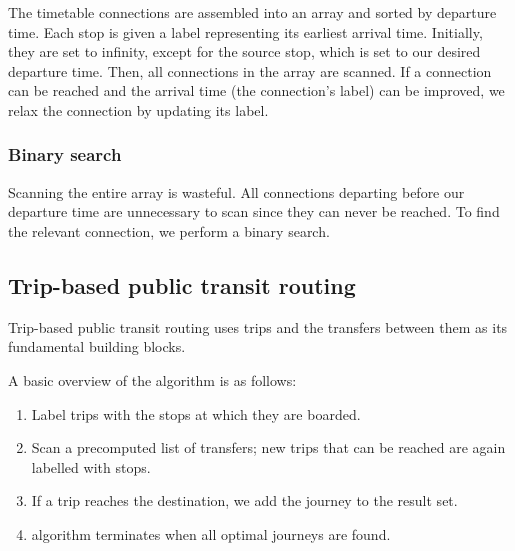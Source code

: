 The timetable connections are assembled into an array and sorted by departure time. Each stop is given a label representing its earliest arrival time. Initially, they are set to infinity, except for the source stop, which is set to our desired departure time. Then, all connections in the array are scanned. If a connection can be reached and the arrival time (the connection’s label) can be improved, we relax the connection by updating its label. 

\subsubsection{Binary search}
Scanning the entire array is wasteful. All connections departing before our departure time are unnecessary to scan since they can never be reached. To find the relevant connection, we perform a binary search. 
\subsection{Trip-based public transit routing}
Trip-based public transit routing uses trips and the transfers between them as its fundamental building blocks. 

A basic overview of the algorithm is as follows:
\begin{enumerate}
    \item Label trips with the stops at which they are boarded.
    \item Scan a precomputed list of transfers; new trips that can be reached are again labelled with stops.
    \item If a trip reaches the destination, we add the journey to the result set.
    \item algorithm terminates when all optimal journeys are found.
\end{enumerate}
